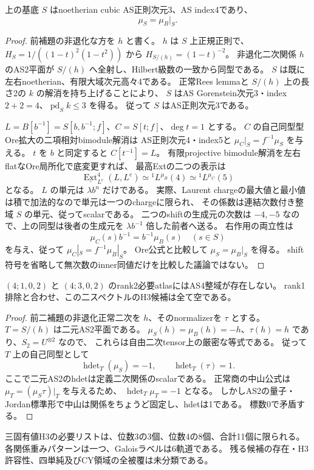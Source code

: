 \begin{lemma}
\label{lem:cubic-rank2-base-Nakayama-comparison}
上の基底 $S$ はnoetherian cubic AS正則次元3、AS index4であり、
\[
 \mu_S=\mu_B|_S.
\]
\end{lemma}
\begin{proof}
前補題の非退化な方を $h$ と書く。
$h$ は $S$ 上正規正則で、$H_S=1/((1-t)^2(1-t^2))$ から
$H_{S/(h)}=(1-t)^{-2}$。
非退化二次関係 $h$ のAS2平面が $S/(h)$ へ全射し、Hilbert級数の一致から同型である。
$S$ は既に左右noetherian、有限大域次元高々4である。
正常Rees lemmaと $S/(h)$ 上の長さ2の $k$ の解消を持ち上げることにより、
$S$ はAS Gorenstein次元3・index $2+2=4$、$\operatorname{pd}_S k\le3$ を得る。
従って $S$ はAS正則次元3である。

$L=B[b^{-1}]=S[b,b^{-1};f]$、$C=S[t;f]$、$\deg t=1$ とする。
$C$ の自己同型型Ore拡大の二項相対bimodule解消は
AS正則次元4・index5と $\mu_C|_S=f^{-1}\mu_S$ を与える。
$t$ を $b$ と同定すると $C[t^{-1}]=L$。
有限projective bimodule解消を左右flatなOre局所化で底変更すれば、
最高Extの二つの表示は
\[
 \underline{\operatorname{Ext}}^4_{L^e}(L,L^e)
 \simeq {}^1L^{\mu_B}(4)
 \simeq {}^1L^{\mu_C}(5)
\]
となる。
$L$ の単元は $\lambda b^n$ だけである。
実際、Laurent chargeの最大値と最小値は積で加法的なので単元は一つのchargeに限られ、
その係数は連結次数付き整域 $S$ の単元、従ってscalarである。
二つのshiftの生成元の次数は $-4,-5$ なので、上の同型は後者の生成元を
$\lambda b^{-1}$ 倍した前者へ送る。
右作用の両立性は
\[
 \mu_C(s)b^{-1}=b^{-1}\mu_B(s)\quad(s\in S)
\]
を与え、従って $\mu_C|_S=f^{-1}\mu_B|_S$。
Ore公式と比較して $\mu_S=\mu_B|_S$ を得る。
shift符号を省略して無次数のinner同値だけを比較した議論ではない。
\end{proof}

\begin{theorem}
\label{thm:cubic-fourth-root-unit-simple-rank2-empty}
$(4;1,0,2)$ と $(4;3,0,2)$ のrank2必要atlasにはAS4整域が存在しない。
rank1排除と合わせ、この二スペクトルのH3候補は全て空である。
\end{theorem}
\begin{proof}
前二補題の非退化正常二次を $h$、そのnormalizerを $\tau$ とする。
$T=S/(h)$ は二元AS2平面である。
$\mu_S(h)=\mu_B(h)=-h$、$\tau(h)=h$ であり、$S_2=U^{\otimes2}$ なので、
これらは自由二次tensor上の厳密な等式である。
従って $T$ 上の自己同型として
\[
 \operatorname{hdet}_T(\mu_S)=-1,\qquad
 \operatorname{hdet}_T(\tau)=1.
\]
ここで二元AS2のhdetは定義二次関係のscalarである。
正常商の中山公式\cite[Lemma 1.5]{RRZ}は $\mu_T=(\mu_S\tau)|_T$ を与えるため、
$\operatorname{hdet}_T\mu_T=-1$ となる。
しかしAS2の量子・Jordan標準形で中山は関係をちょうど固定し、hdetは1である。
標数0で矛盾する。
\end{proof}

\begin{corollary}
\label{cor:cubic-three-eigenvalue-11-list}
三固有値H3の必要リストは、位数3の3個、位数4の8個、合計11個に限られる。
各関係重みパターンは一つ、Galoisラベルは6軌道である。
残る候補の存在・H3許容性、四単純及びCY領域の全被覆は未分類である。
\end{corollary}
